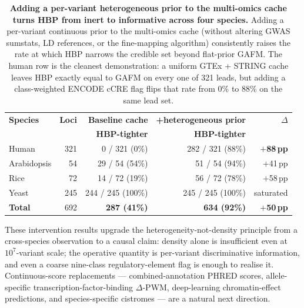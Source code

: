\begin{table}[htbp]
\centering
\small
\caption{\textbf{Adding a per-variant heterogeneous prior to the
multi-omics cache turns HBP from inert to informative across four
species.} Adding a per-variant continuous prior to the
multi-omics cache (without altering GWAS sumstats, LD references, or
the fine-mapping algorithm) consistently raises the rate at which HBP
narrows the credible set beyond flat-prior GAFM. The human row is the
cleanest demonstration: a uniform GTEx + STRING cache leaves HBP
exactly equal to GAFM on every one of 321 leads, but adding a
class-weighted ENCODE cCRE flag flips that rate from 0\% to 88\% on
the same lead set.}
\label{tab:intervention}
\begin{tabular}{lrrrr}
\toprule
\textbf{Species} & \textbf{Loci} & \textbf{Baseline cache} & \textbf{+heterogeneous prior} & \textbf{$\Delta$} \\
                 &               & \textbf{HBP-tighter}     & \textbf{HBP-tighter}             &                   \\
\midrule
Human       & 321 & 0 / 321 (0\%)   & 282 / 321 (88\%) & \textbf{$+$88\,pp} \\
Arabidopsis &  54 & 29 / 54 (54\%)  & 51 / 54 (94\%)   & $+$41\,pp \\
Rice        &  72 & 14 / 72 (19\%)  & 56 / 72 (78\%)   & $+$58\,pp \\
Yeast       & 245 & 244 / 245 (100\%) & 245 / 245 (100\%) & saturated \\
\midrule
\textbf{Total} & 692 & \textbf{287 (41\%)} & \textbf{634 (92\%)} & \textbf{$+$50\,pp} \\
\bottomrule
\end{tabular}
\end{table}

These intervention results upgrade the heterogeneity-not-density
principle from a cross-species observation to a causal claim:
density alone is insufficient even at $10^7$-variant scale; the
operative quantity is per-variant discriminative information, and
even a coarse nine-class regulatory-element flag is enough to
realise it. Continuous-score replacements --- combined-annotation
PHRED scores, allele-specific transcription-factor-binding
$\Delta$-PWM, deep-learning chromatin-effect predictions, and
species-specific cistromes --- are a natural next direction.

